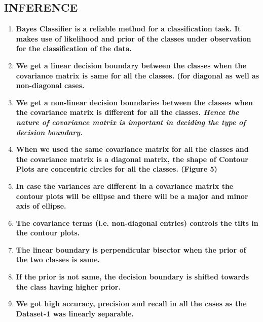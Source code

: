\subsection{INFERENCE}
\begin{enumerate}
  \item \textbf{Bayes Classifier is a reliable method for a classification task. It makes use of likelihood and prior of the classes under observation for the classification of the data.}
  \item \textbf{We get a linear decision boundary between the classes when the covariance matrix is same for all the classes. (for diagonal as well as non-diagonal cases.}
  \item \textbf{We get a non-linear decision boundaries between the classes when the covariance matrix is different for all the classes. \textit{Hence the nature of covariance matrix is important in deciding the type of decision boundary.}}
  \item \textbf{When we used the same covariance matrix for all the classes and the covariance matrix is a diagonal matrix, the shape of Contour Plots are concentric circles for all the classes. (Figure 5)}
  \item \textbf{In case the variances are different in a covariance matrix the contour plots will be ellipse and there will be a major and minor axis of ellipse.}
  \item \textbf{The covariance terms (i.e. non-diagonal entries) controls the tilts in the contour plots.}
  \item \textbf{The linear boundary is perpendicular bisector when the prior of the two classes is same.}
  \item \textbf{If the prior is not same, the decision boundary is shifted towards the class having higher prior.}
  \item \textbf{We got high accuracy, precision and recall in all the cases as the Dataset-1 was linearly separable.}
  
\end{enumerate}

